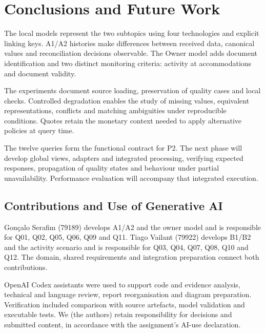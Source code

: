 \section{Conclusions and Future Work}\label{sec:conclusao}
The local models represent the two subtopics using four technologies and explicit linking keys. A1/A2 histories make differences between received data, canonical values and reconciliation decisions observable. The Owner model adds document identification and two distinct monitoring criteria: activity at accommodations and document validity.

The experiments document source loading, preservation of quality cases and local checks. Controlled degradation enables the study of missing values, equivalent representations, conflicts and matching ambiguities under reproducible conditions. Quotes retain the monetary context needed to apply alternative policies at query time.

The twelve queries form the functional contract for P2. The next phase will develop global views, adapters and integrated processing, verifying expected responses, propagation of quality states and behaviour under partial unavailability. Performance evaluation will accompany that integrated execution.
\subsection{Contributions and Use of Generative AI}
Gonçalo Serafim (79189) develops A1/A2 and the owner model and is responsible for Q01, Q02, Q05, Q06, Q09 and Q11. Tiago Vailant (79922) develops B1/B2 and the activity scenario and is responsible for Q03, Q04, Q07, Q08, Q10 and Q12. The domain, shared requirements and integration preparation connect both contributions.

OpenAI Codex assistants were used to support code and evidence analysis, technical and language review, report reorganisation and diagram preparation. Verification included comparison with source artefacts, model validation and executable tests. We (the authors) retain responsibility for decisions and submitted content, in accordance with the assignment's AI-use declaration.
